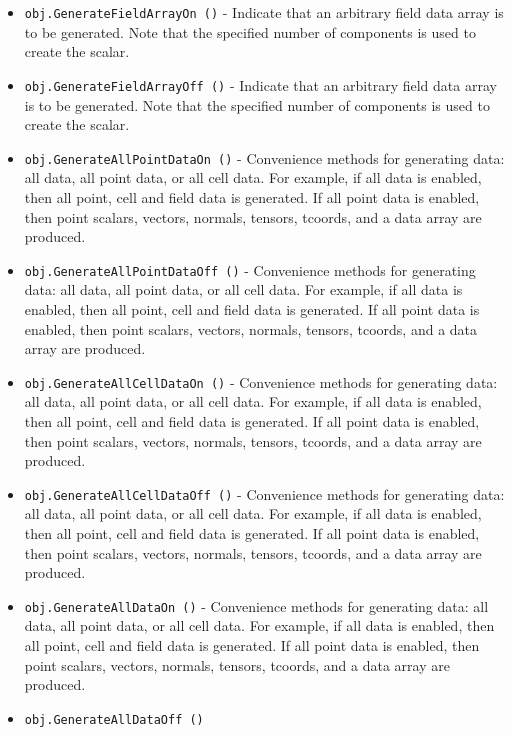 \begin{itemize}
\item  \verb|obj.GenerateFieldArrayOn ()| -  Indicate that an arbitrary field data array is to be generated. Note
 that the specified number of components is used to create the scalar.

\item  \verb|obj.GenerateFieldArrayOff ()| -  Indicate that an arbitrary field data array is to be generated. Note
 that the specified number of components is used to create the scalar.

\item  \verb|obj.GenerateAllPointDataOn ()| -  Convenience methods for generating data: all data, all point data, or all cell data.
 For example, if all data is enabled, then all point, cell and field data is generated.
 If all point data is enabled, then point scalars, vectors, normals, tensors, tcoords,
 and a data array are produced.

\item  \verb|obj.GenerateAllPointDataOff ()| -  Convenience methods for generating data: all data, all point data, or all cell data.
 For example, if all data is enabled, then all point, cell and field data is generated.
 If all point data is enabled, then point scalars, vectors, normals, tensors, tcoords,
 and a data array are produced.

\item  \verb|obj.GenerateAllCellDataOn ()| -  Convenience methods for generating data: all data, all point data, or all cell data.
 For example, if all data is enabled, then all point, cell and field data is generated.
 If all point data is enabled, then point scalars, vectors, normals, tensors, tcoords,
 and a data array are produced.

\item  \verb|obj.GenerateAllCellDataOff ()| -  Convenience methods for generating data: all data, all point data, or all cell data.
 For example, if all data is enabled, then all point, cell and field data is generated.
 If all point data is enabled, then point scalars, vectors, normals, tensors, tcoords,
 and a data array are produced.

\item  \verb|obj.GenerateAllDataOn ()| -  Convenience methods for generating data: all data, all point data, or all cell data.
 For example, if all data is enabled, then all point, cell and field data is generated.
 If all point data is enabled, then point scalars, vectors, normals, tensors, tcoords,
 and a data array are produced.

\item  \verb|obj.GenerateAllDataOff ()|

\end{itemize}
